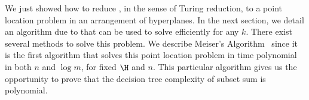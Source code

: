 We just showed how to reduce \kSUM, in the sense of Turing reduction, to a
point location problem in an arrangement of hyperplanes. In the next section,
we detail an algorithm due to \citet*{meiser:1993} that can be used to
solve \kSUM efficiently for any $k$. There exist several methods to solve
this problem. We describe Meiser's Algorithm~\cite{meiser:1993} since it
is the first algorithm that solves this point location problem in time
polynomial in both $n$ and $\log m$, for fixed $\H$ and $n$. This particular
algorithm gives us the opportunity to prove that the decision tree complexity
of subset sum is polynomial.

